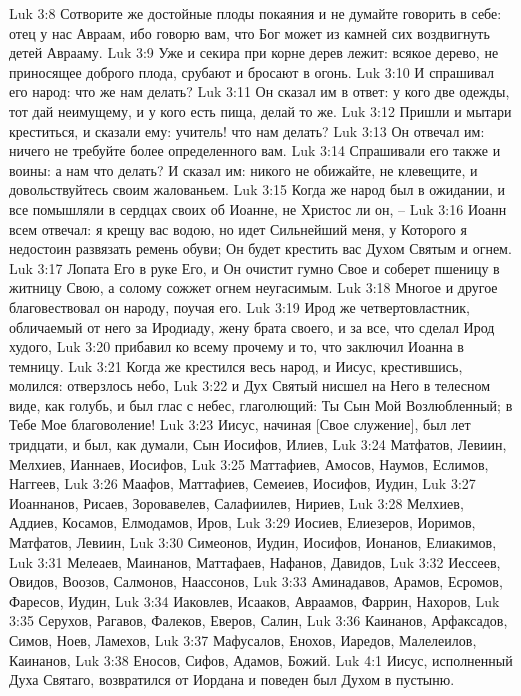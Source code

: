 Luk 3:8  Сотворите же достойные плоды покаяния и не думайте говорить в себе: отец у нас Авраам, ибо говорю вам, что Бог может из камней сих воздвигнуть детей Аврааму.
Luk 3:9  Уже и секира при корне дерев лежит: всякое дерево, не приносящее доброго плода, срубают и бросают в огонь.
Luk 3:10  И спрашивал его народ: что же нам делать?
Luk 3:11  Он сказал им в ответ: у кого две одежды, тот дай неимущему, и у кого есть пища, делай то же.
Luk 3:12  Пришли и мытари креститься, и сказали ему: учитель! что нам делать?
Luk 3:13  Он отвечал им: ничего не требуйте более определенного вам.
Luk 3:14  Спрашивали его также и воины: а нам что делать? И сказал им: никого не обижайте, не клевещите, и довольствуйтесь своим жалованьем.
Luk 3:15  Когда же народ был в ожидании, и все помышляли в сердцах своих об Иоанне, не Христос ли он, --
Luk 3:16  Иоанн всем отвечал: я крещу вас водою, но идет Сильнейший меня, у Которого я недостоин развязать ремень обуви; Он будет крестить вас Духом Святым и огнем.
Luk 3:17  Лопата Его в руке Его, и Он очистит гумно Свое и соберет пшеницу в житницу Свою, а солому сожжет огнем неугасимым.
Luk 3:18  Многое и другое благовествовал он народу, поучая его.
Luk 3:19  Ирод же четвертовластник, обличаемый от него за Иродиаду, жену брата своего, и за все, что сделал Ирод худого,
Luk 3:20  прибавил ко всему прочему и то, что заключил Иоанна в темницу.
Luk 3:21  Когда же крестился весь народ, и Иисус, крестившись, молился: отверзлось небо,
Luk 3:22  и Дух Святый нисшел на Него в телесном виде, как голубь, и был глас с небес, глаголющий: Ты Сын Мой Возлюбленный; в Тебе Мое благоволение!
Luk 3:23  Иисус, начиная [Свое служение], был лет тридцати, и был, как думали, Сын Иосифов, Илиев,
Luk 3:24  Матфатов, Левиин, Мелхиев, Ианнаев, Иосифов,
Luk 3:25  Маттафиев, Амосов, Наумов, Еслимов, Наггеев,
Luk 3:26  Маафов, Маттафиев, Семеиев, Иосифов, Иудин,
Luk 3:27  Иоаннанов, Рисаев, Зоровавелев, Салафиилев, Нириев,
Luk 3:28  Мелхиев, Аддиев, Косамов, Елмодамов, Иров,
Luk 3:29  Иосиев, Елиезеров, Иоримов, Матфатов, Левиин,
Luk 3:30  Симеонов, Иудин, Иосифов, Ионанов, Елиакимов,
Luk 3:31  Мелеаев, Маинанов, Маттафаев, Нафанов, Давидов,
Luk 3:32  Иессеев, Овидов, Воозов, Салмонов, Наассонов,
Luk 3:33  Аминадавов, Арамов, Есромов, Фаресов, Иудин,
Luk 3:34  Иаковлев, Исааков, Авраамов, Фаррин, Нахоров,
Luk 3:35  Серухов, Рагавов, Фалеков, Еверов, Салин,
Luk 3:36  Каинанов, Арфаксадов, Симов, Ноев, Ламехов,
Luk 3:37  Мафусалов, Енохов, Иаредов, Малелеилов, Каинанов,
Luk 3:38  Еносов, Сифов, Адамов, Божий.
Luk 4:1  Иисус, исполненный Духа Святаго, возвратился от Иордана и поведен был Духом в пустыню.
